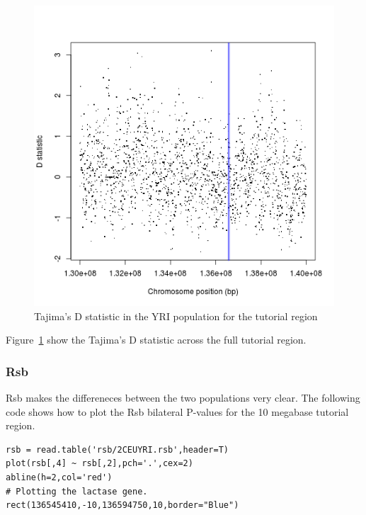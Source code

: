 \documentclass[a4paper,10pt]{article}
\begin{document}
\begin{figure}
\centering
\includegraphics{pictures/YRItajimas.png}
\caption{Tajima's D statistic in the YRI population for the tutorial region} 
\label{fig:tajyri}
\end{figure}

\noindent
Figure~\ref{fig:tajyri} show the Tajima's D statistic across the full tutorial region.

\subsubsection{Rsb}

Rsb makes the differeneces between the two populations very clear. The following code shows how to plot the Rsb bilateral P-values for the 10 megabase tutorial region.

\begin{verbatim}
rsb = read.table('rsb/2CEUYRI.rsb',header=T)
plot(rsb[,4] ~ rsb[,2],pch='.',cex=2)
abline(h=2,col='red')
# Plotting the lactase gene.
rect(136545410,-10,136594750,10,border="Blue")
\end{verbatim}
\end{document}
